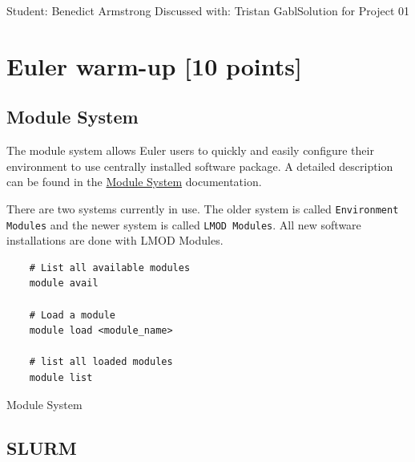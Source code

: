 \documentclass[unicode,11pt,a4paper,oneside,numbers=endperiod,openany]{scrartcl}
\begin{document}
\setassignment
{}

{Student: Benedict Armstrong}
{Discussed with: Tristan Gabl}{Solution for Project 01}{}
\newline




\section{Euler warm-up [10 points]}

\subsection{Module System}

The module system allows Euler users to quickly and easily configure their environment to use centrally installed software package. A detailed description can be found in the \href{https://scicomp.ethz.ch/wiki/Modules_and_applications}{Module System} documentation.

There are two systems currently in use. The older system is called \texttt{Environment Modules} and the newer system is called \texttt{LMOD Modules}. All new software installations are done with LMOD Modules.

\begin{listing}[!ht]
    \begin{verbatim}
    # List all available modules
    module avail
    
    # Load a module
    module load <module_name>
    
    # list all loaded modules
    module list
    \end{verbatim}
    \caption{Module System}
    \label{lst:module_system}
\end{listing}

\subsection{SLURM}
\end{document}

